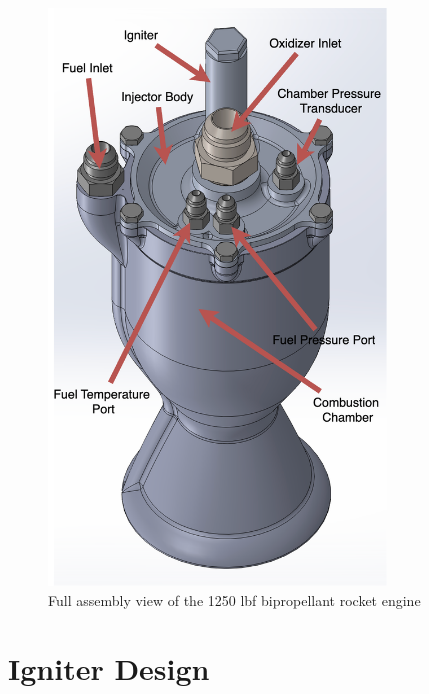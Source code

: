 \begin{figure}[H]
    \centering
    \includegraphics[width=0.8\textwidth]{Images/fullassembly.png}
    \caption{Full assembly view of the 1250 lbf bipropellant rocket engine}
    \label{fig:fullassembly}
\end{figure}

\section{Igniter Design}


